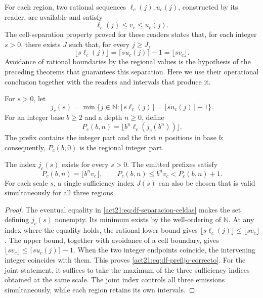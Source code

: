 For each region, two rational sequences
\(\ell_c(j),u_c(j)\), constructed by its reader, are available and satisfy
\[
 \ell_c(j)\leq v_c\leq u_c(j).
\]
The cell-separation property proved for these readers states that, for
each integer \(s>0\), there exists \(J\) such that, for every \(j\geq J\),
\begin{equation}
 \lfloor s\ell_c(j)\rfloor
 =\lceil su_c(j)\rceil-1
 =\lfloor sv_c\rfloor.
 \label{act21:eq:df-separacion-celdas}
\end{equation}
Avoidance of rational boundaries by the regional values is the hypothesis
of the preceding theorems that guarantees this separation. Here we use
their operational conclusion together with the readers and intervals
that produce it.

\begin{definition}
For \(s>0\), let
\[
 j_c(s)=\min\{j\in\mathbb N:
 \lfloor s\ell_c(j)\rfloor=\lceil su_c(j)\rceil-1\}.
\]
For an integer base \(b\geq2\) and a depth \(n\geq0\), define
\begin{equation}
 P_c(b,n)=\lfloor b^n\ell_c(j_c(b^n))\rfloor.
 \label{act21:eq:df-publicacion-prefijo}
\end{equation}
The prefix contains the integer part and the first \(n\) positions in base
\(b\); consequently, \(P_c(b,0)\) is the regional integer part.
\end{definition}

\begin{theorem}
\label{act21:thm:df-emision-correcta}
The index \(j_c(s)\) exists for every \(s>0\). The emitted prefixes satisfy
\begin{equation}
 P_c(b,n)=\lfloor b^n v_c\rfloor,
 \qquad
 P_c(b,n)\leq b^n v_c<P_c(b,n)+1.
 \label{act21:eq:df-prefijo-correcto}
\end{equation}
For each scale \(s\), a single sufficiency index \(J(s)\) can also be
chosen that is valid simultaneously for all three regions.
\end{theorem}

\begin{proof}
The eventual equality in \eqref{act21:eq:df-separacion-celdas} makes the set
defining \(j_c(s)\) nonempty. Its minimum exists by the well-ordering of
\(\mathbb N\). At any index where the equality holds, the rational lower
bound gives
\(\lfloor s\ell_c(j)\rfloor\leq\lfloor sv_c\rfloor\).
The upper bound, together with avoidance of a cell boundary, gives
\(\lfloor sv_c\rfloor\leq\lceil su_c(j)\rceil-1\).
When the two integer endpoints coincide, the intervening integer coincides
with them. This proves \eqref{act21:eq:df-prefijo-correcto}. For the joint
statement, it suffices to take the maximum of the three sufficiency indices
obtained at the same scale. The joint index controls all three emissions
simultaneously, while each region retains its own intervals.
\end{proof}

